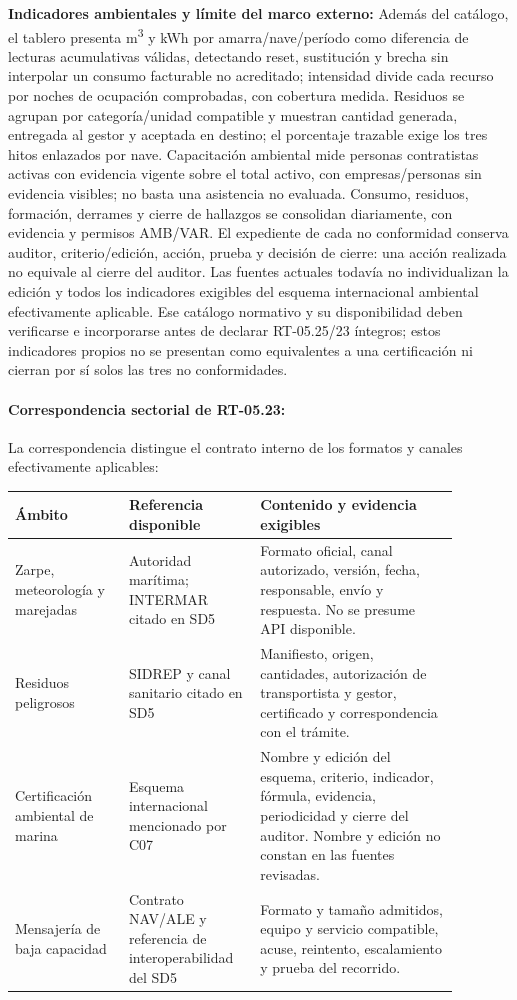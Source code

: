\textbf{Indicadores ambientales y límite del marco externo:} Además del catálogo, el tablero presenta m\textsuperscript{3} y kWh por amarra/nave/período como diferencia de lecturas acumulativas válidas, detectando reset, sustitución y brecha sin interpolar un consumo facturable no acreditado; intensidad divide cada recurso por noches de ocupación comprobadas, con cobertura medida. Residuos se agrupan por categoría/unidad compatible y muestran cantidad generada, entregada al gestor y aceptada en destino; el porcentaje trazable exige los tres hitos enlazados por nave. Capacitación ambiental mide personas contratistas activas con evidencia vigente sobre el total activo, con empresas/personas sin evidencia visibles; no basta una asistencia no evaluada. Consumo, residuos, formación, derrames y cierre de hallazgos se consolidan diariamente, con evidencia y permisos AMB/VAR. El expediente de cada no conformidad conserva auditor, criterio/edición, acción, prueba y decisión de cierre: una acción realizada no equivale al cierre del auditor. Las fuentes actuales todavía no individualizan la edición y todos los indicadores exigibles del esquema internacional ambiental efectivamente aplicable. Ese catálogo normativo y su disponibilidad deben verificarse e incorporarse antes de declarar RT-05.25/23 íntegros; estos indicadores propios no se presentan como equivalentes a una certificación ni cierran por sí solos las tres no conformidades.

\paragraph{Correspondencia sectorial de RT-05.23:}
La correspondencia distingue el contrato interno de los formatos y canales efectivamente aplicables:

\begingroup\small
\begin{longtable}{@{}p{0.23\linewidth}p{0.25\linewidth}p{0.40\linewidth}@{}}
\textbf{Ámbito} & \textbf{Referencia disponible} & \textbf{Contenido y evidencia exigibles} \\
\hline
Zarpe, meteorología y marejadas & Autoridad marítima; INTERMAR citado en SD5 & Formato oficial, canal autorizado, versión, fecha, responsable, envío y respuesta. No se presume API disponible. \\
Residuos peligrosos & SIDREP y canal sanitario citado en SD5 & Manifiesto, origen, cantidades, autorización de transportista y gestor, certificado y correspondencia con el trámite. \\
Certificación ambiental de marina & Esquema internacional mencionado por C07 & Nombre y edición del esquema, criterio, indicador, fórmula, evidencia, periodicidad y cierre del auditor. Nombre y edición no constan en las fuentes revisadas. \\
Mensajería de baja capacidad & Contrato NAV/ALE y referencia de interoperabilidad del SD5 & Formato y tamaño admitidos, equipo y servicio compatible, acuse, reintento, escalamiento y prueba del recorrido. \\
\end{longtable}
\endgroup

